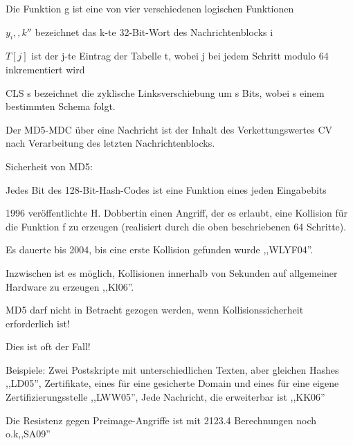 \documentclass[a4paper]{article}
\begin{document}
\begin{multicols}{3}
\begin{itemize*}
\begin{itemize*}
\begin{itemize*}
                  \end{itemize*}
            \end{itemize*}
            \begin{itemize*}
                  \item Die Funktion g ist eine von vier verschiedenen logischen Funktionen
                  \item $y_i,,k''$ bezeichnet das k-te 32-Bit-Wort des Nachrichtenblocks i
                  \item $T[j]$ ist der j-te Eintrag der Tabelle t, wobei j bei jedem Schritt modulo 64 inkrementiert wird
                  \item CLS s bezeichnet die zyklische Linksverschiebung um s Bits, wobei s einem bestimmten Schema folgt.
            \end{itemize*}
            \item Der MD5-MDC über eine Nachricht ist der Inhalt des Verkettungswertes CV nach Verarbeitung des letzten Nachrichtenblocks.
            \item Sicherheit von MD5:
            \begin{itemize*}
                  \item Jedes Bit des 128-Bit-Hash-Codes ist eine Funktion eines jeden Eingabebits
                  \item 1996 veröffentlichte H. Dobbertin einen Angriff, der es erlaubt, eine Kollision für die Funktion f zu erzeugen (realisiert durch die oben beschriebenen 64 Schritte).
                  \item Es dauerte bis 2004, bis eine erste Kollision gefunden wurde ,,WLYF04''.
                  \item Inzwischen ist es möglich, Kollisionen innerhalb von Sekunden auf allgemeiner Hardware zu erzeugen ,,Kl06''.
                  \item MD5 darf nicht in Betracht gezogen werden, wenn Kollisionssicherheit erforderlich ist!
                  \begin{itemize*}
                        \item Dies ist oft der Fall!
                        \item Beispiele: Zwei Postskripte mit unterschiedlichen Texten, aber gleichen Hashes ,,LD05'', Zertifikate, eines für eine gesicherte Domain und eines für eine eigene Zertifizierungsstelle ,,LWW05'', Jede Nachricht, die erweiterbar ist ,,KK06''
                  \end{itemize*}
                  \item Die Resistenz gegen Preimage-Angriffe ist mit 2123.4 Berechnungen noch o.k,,SA09''
            \end{itemize*}
      \end{itemize*}


\end{multicols}
\end{document}
